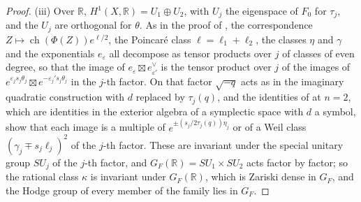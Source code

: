 \documentclass[11pt,reqno]{amsart}
\theoremstyle{plain}
\theoremstyle{definition}
\theoremstyle{remark}
\newcommand{\RR}{\mathbb{R}}
\DeclareMathOperator{\ch}{ch}
\begin{document}
\begin{proof}
(iii) Over $\RR$, $H^{1}(X,\RR)=U_{1}\oplus U_{2}$, with $U_{j}$ the eigenspace
of $F_{0}$ for $\tau_{j}$, and the $U_{j}$ are orthogonal for $\theta$. As in
the proof of , the correspondence $Z\mapsto\ch(\Phi(Z))
e^{\ell/2}$, the Poincar\'e class $\ell=\ell_{1}+\ell_{2}$, the classes $\eta$
and $\gamma$ and the exponentials $e_{\varepsilon}$ all decompose as tensor
products over $j$ of classes of even degree, so that the image of
$e_{\varepsilon}\boxtimes e_{\varepsilon'}^{\vee}$ is the tensor product over $j$
of the images of $e^{\varepsilon_{j}s_{j}\theta_{j}}\boxtimes
e^{-\varepsilon_{j}'s_{j}\theta_{j}}$ in the $j$-th factor. On that factor
$\sqrt{-q}$ acts as in the imaginary quadratic construction with $d$ replaced
by $\tau_{j}(q)$, and the identities of  at $n=2$, which
are identities in the exterior algebra of a symplectic space with $d$ a
symbol, show that each image is a multiple of $e^{\pm(s_{j}/2\tau_{j}(q))\eta_{j}}$
or of a Weil class $(\gamma_{j}\mp s_{j}\ell_{j})^{2}$ of the $j$-th factor.
These are invariant under the special unitary group $SU_{j}$ of the $j$-th
factor, and $G_{F}(\RR)=SU_{1}\times SU_{2}$ acts factor by factor; so the
rational class $\kappa$ is invariant under $G_{F}(\RR)$, which is Zariski dense
in $G_{F}$, and the Hodge group of every member of the family lies in $G_{F}$.
\end{proof}
\end{document}
